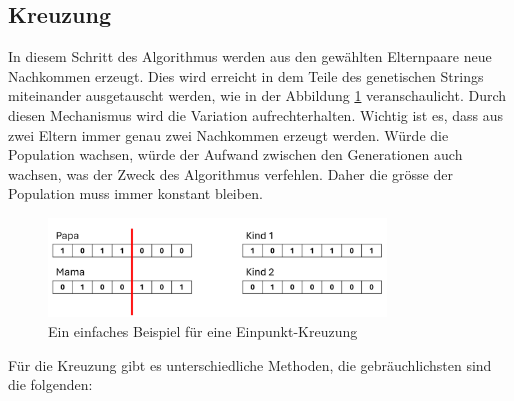 %
%
%
%
\subsection{Kreuzung
\label{buch:paper:varalg:subsection:crossover}}
In diesem Schritt des Algorithmus werden aus den gewählten Elternpaare 
neue Nachkommen erzeugt. Dies wird erreicht in dem Teile des genetischen 
Strings miteinander ausgetauscht werden, 
wie in der Abbildung \ref{fig:one_point_crossover} veranschaulicht.
Durch diesen Mechanismus wird die Variation aufrechterhalten. Wichtig ist es,
dass aus zwei Eltern immer genau zwei Nachkommen erzeugt werden. Würde
die Population wachsen, würde der Aufwand zwischen den Generationen auch
wachsen, was der Zweck des Algorithmus verfehlen. Daher die grösse der
Population muss immer konstant bleiben.
\begin{figure}
	\centering
	\includegraphics[width=0.8\textwidth]{
		papers/varalg/images/teil3/05GeneticStringCross.png
	}
	\caption{Ein einfaches Beispiel für eine Einpunkt-Kreuzung}
	\label{fig:one_point_crossover}
\end{figure}
Für die Kreuzung gibt es unterschiedliche Methoden, die gebräuchlichsten sind
die folgenden:
